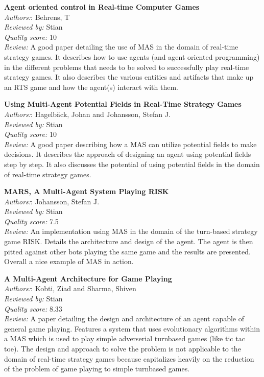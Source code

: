\textbf{Agent oriented control in Real-time Computer Games}\\
\textit{Authors:}: Behrens, T\\
\textit{Reviewed by:} Stian\\
\textit{Quality score:} 10\\
\textit{Review:} A good paper detailing the use of MAS in the domain of real-time strategy games. It describes how to use agents (and agent oriented programming) in the different problems that needs to be solved to successfully play real-time strategy games. It also describes the various entities and artifacts that make up an RTS game and how the agent(s) interact with them. 

\textbf{Using Multi-Agent Potential Fields in Real-Time Strategy Games}\\
\textit{Authors:}: Hagelbäck, Johan and Johansson, Stefan J.\\
\textit{Reviewed by:} Stian\\
\textit{Quality score:} 10\\
\textit{Review:} A good paper describing how a MAS can utilize potential fields to make decisions. It describes the approach of designing an agent using potential fields step by step. It also discusses the potential of using potential fields in the domain of real-time strategy games.

\textbf{MARS, A Multi-Agent System Playing RISK}\\
\textit{Authors:}: Johansson, Stefan J.\\
\textit{Reviewed by:} Stian\\
\textit{Quality score:} 7.5\\
\textit{Review:} An implementation using MAS in the domain of the turn-based strategy game RISK. Details the architecture and design of the agent. The agent is then pitted against other bots playing the same game and the results are presented. Overall a nice example of MAS in action. 

\textbf{A Multi-Agent Architecture for Game Playing}\\
\textit{Authors:}: Kobti, Ziad and Sharma, Shiven\\
\textit{Reviewed by:} Stian\\
\textit{Quality score:} 8.33\\
\textit{Review:} A paper detailing the design and architecture of an agent capable of general game playing. Features a system that uses evolutionary algorithms within a MAS which is used to play simple adverserial turnbased games (like tic tac toe). The design and approach to solve the problem is not applicable to the domain of real-time strategy games because capitalizes heavily on the reduction of the problem of game playing to simple turnbased games.

